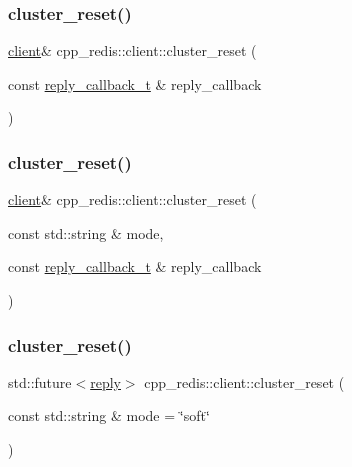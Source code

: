 \subsubsection{\texorpdfstring{cluster\+\_\+reset()}{cluster\_reset()}\hspace{0.1cm}{\footnotesize\ttfamily [1/3]}}
{\footnotesize\ttfamily \hyperlink{classcpp__redis_1_1client}{client}\& cpp\+\_\+redis\+::client\+::cluster\+\_\+reset (\begin{DoxyParamCaption}\item[{const \hyperlink{classcpp__redis_1_1client_a061a1140d36d2eaeda82b09a0bb3f9f2}{reply\+\_\+callback\+\_\+t} \&}]{reply\+\_\+callback }\end{DoxyParamCaption})}

\mbox{\label{classcpp__redis_1_1client_a3f039634232d14d4eec6fea27784a347}} 
\subsubsection{\texorpdfstring{cluster\+\_\+reset()}{cluster\_reset()}\hspace{0.1cm}{\footnotesize\ttfamily [2/3]}}
{\footnotesize\ttfamily \hyperlink{classcpp__redis_1_1client}{client}\& cpp\+\_\+redis\+::client\+::cluster\+\_\+reset (\begin{DoxyParamCaption}\item[{const std\+::string \&}]{mode,  }\item[{const \hyperlink{classcpp__redis_1_1client_a061a1140d36d2eaeda82b09a0bb3f9f2}{reply\+\_\+callback\+\_\+t} \&}]{reply\+\_\+callback }\end{DoxyParamCaption})}

\mbox{\label{classcpp__redis_1_1client_ac49706b4ea17538653a6e5a77791ae31}} 
\subsubsection{\texorpdfstring{cluster\+\_\+reset()}{cluster\_reset()}\hspace{0.1cm}{\footnotesize\ttfamily [3/3]}}
{\footnotesize\ttfamily std\+::future$<$\hyperlink{classcpp__redis_1_1reply}{reply}$>$ cpp\+\_\+redis\+::client\+::cluster\+\_\+reset (\begin{DoxyParamCaption}\item[{const std\+::string \&}]{mode = {\ttfamily \char`\"{}soft\char`\"{}} }\end{DoxyParamCaption})}

